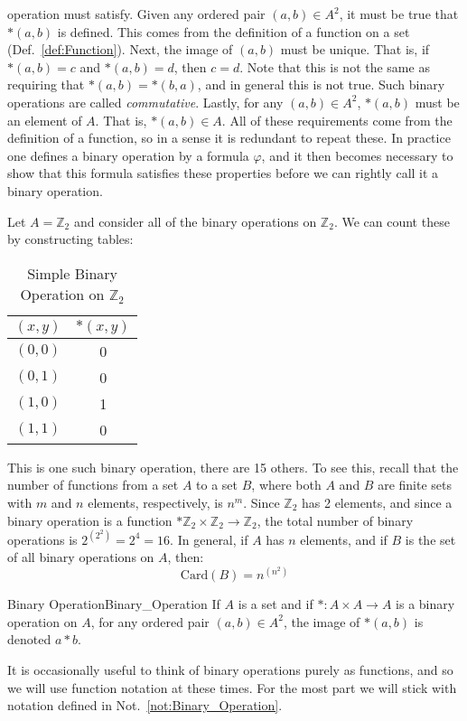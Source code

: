     operation must satisfy. Given any ordered pair $(a,b)\in{A}^{2}$, it must
    be true that $*(a,b)$ is defined. This comes from the definition of a
    function on a set (Def.~\ref{def:Function}). Next, the image of $(a,b)$ must
    be unique. That is, if $*(a,b)=c$ and $*(a,b)=d$, then $c=d$. Note that this
    is not the same as requiring that $*(a,b)=*(b,a)$, and in general this is
    not true. Such binary operations are called
    \textit{commutative}. Lastly, for any
    $(a,b)\in{A}^{2}$, $*(a,b)$ must be an element of $A$. That is,
    $*(a,b)\in{A}$. All of these requirements come from the definition of a
    function, so in a sense it is redundant to repeat these. In practice one
    defines a binary operation by a formula $\varphi$, and it then becomes
    necessary to show that this formula satisfies these properties before we can
    rightly call it a binary operation.
    \begin{example}
        Let $A=\mathbb{Z}_{2}$ and consider all of the binary operations on
        $\mathbb{Z}_{2}$. We can count these by constructing tables:
        \begin{table}[H]
            \centering
            \begin{tabular}{c|c}
                $(x,y)$&$*(x,y)$\\
                \hline
                $(0,0)$&0\\
                $(0,1)$&0\\
                $(1,0)$&1\\
                $(1,1)$&0
            \end{tabular}
            \label{tab:Binary_Operation_on_Z_2}
            \caption{Simple Binary Operation on $\mathbb{Z}_{2}$}
        \end{table}
        This is one such binary operation, there are 15 others. To see this,
        recall that the number of functions from a set $A$ to a set $B$, where
        both $A$ and $B$ are finite sets with $m$ and $n$ elements,
        respectively, is $n^{m}$. Since $\mathbb{Z}_{2}$ has 2 elements, and
        since a binary operation is a function
        $*\mathbb{Z}_{2}\times\mathbb{Z}_{2}\rightarrow\mathbb{Z}_{2}$, the
        total number of binary operations is $2^{(2^{2})}=2^{4}=16$. In general,
        if $A$ has $n$ elements, and if $B$ is the set of all binary operations
        on $A$, then:
        \begin{equation}
            \textrm{Card}(B)=n^{(n^2)}
        \end{equation}
    \end{example}
    \begin{fnotation}{Binary Operation}{Binary_Operation}
        If $A$ is a set and if $*:A\times{A}\rightarrow{A}$ is a binary
        operation on $A$, for any ordered pair $(a,b)\in{A}^{2}$, the image
        of $*(a,b)$ is denoted $a*b$.
    \end{fnotation}
    It is occasionally useful to think of binary operations purely as functions,
    and so we will use function notation at these times. For the most part we
    will stick with notation defined in Not.~\ref{not:Binary_Operation}.